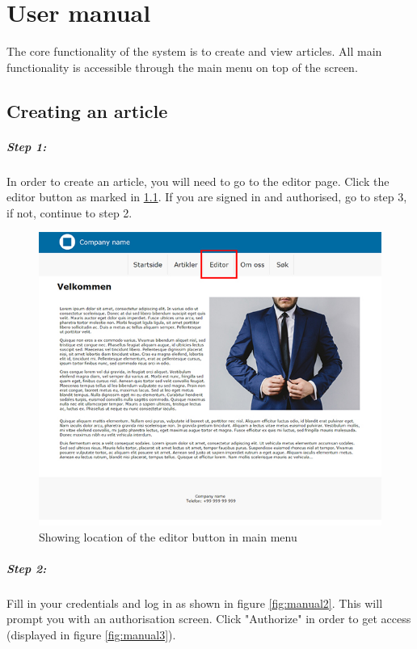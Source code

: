 

\chapter{User manual}
The core functionality of the system is to create and view articles. All main functionality is accessible through the main menu on top of the screen. 


\section{Creating an article}
\paragraph{Step 1:} In order to create an article, you will need to go to the editor page. Click the editor button as marked in \ref{fig:manual1}. If you are signed in and authorised, go to step 3, if not, continue to step 2.

\begin{figure}[H]
    \centering
    \includegraphics[scale=0.70]{fig/userManual/1}
    \caption{Showing location of the editor button in main menu}
    \label{fig:manual1}
\end{figure}


\paragraph{Step 2:} Fill in your credentials and log in as shown in figure \ref{fig:manual2}. This will prompt you with an authorisation screen. Click "Authorize" in order to get access (displayed in figure \ref{fig:manual3}).


